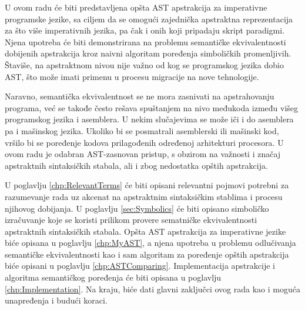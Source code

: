 U ovom radu će biti predstavljena opšta AST apstrakcija za imperativne programske jezike, sa ciljem da se omogući zajednička apstraktna reprezentacija za što više imperativnih jezika, pa čak i onih koji pripadaju skript paradigmi. Njena upotreba će biti demonstrirana na problemu semantičke ekvivalentnosti dobijenih apstrakcija kroz naivni algoritam poređenja simboličkih promenljivih. Štaviše, na apstraktnom nivou nije važno od kog se programskog jezika dobio AST, što može imati primenu u procesu migracije na nove tehnologije.

Naravno, semantička ekvivalentnost se ne mora zasnivati na apstrahovanju programa, već se takođe često rešava spuštanjem na nivo međukoda između višeg programskog jezika i asemblera. U nekim slučajevima se može iči i do asemblera pa i mašinskog jezika. Ukoliko bi se posmatrali asemblerski ili mašinski kod, vršilo bi se poređenje kodova prilagođenih određenoj arhitekturi procesora. U ovom radu je odabran AST-zasnovan pristup, s obzirom na važnosti i značaj apstraktnih sintaksičkih stabala, ali i zbog nedostatka opštih apstrakcija.

U poglavlju \ref{chp:RelevantTerms} će biti opisani relevantni pojmovi potrebni za razumevanje rada uz akcenat na apstraktnim sintaksičkim stablima i procesu njihovog dobijanja. U poglavlju \ref{sec:Symbolics} će biti opisano simboličko izračuvanje koje se koristi prilikom provere sematničke ekvivalentnosti apstraktnih sintaksičkih stabala. Opšta AST apstrakcija za imperativne jezike biće opisana u poglavlju \ref{chp:MyAST}, a njena upotreba u problemu odlučivanja semantičke ekvivalentnosti kao i sam algoritam za poređenje opštih apstrakcija biće opisani u poglavlju \ref{chp:ASTComparing}. Implementacija apstrakcije i algoritma semantičkog poređenja će biti opisana u poglavlju \ref{chp:Implementation}. Na kraju, biće dati glavni zaključci ovog rada kao i moguća unapređenja i budući koraci. 

